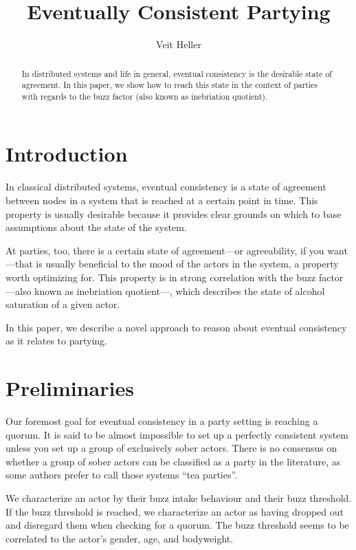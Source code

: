 \documentclass[twocolumn]{article}
\begin{document}
\title{Eventually Consistent Partying}
\author{Veit Heller}

\maketitle

\begin{abstract}
In distributed systems and life in general, eventual consistency is the
desirable state of agreement. In this paper, we show how to reach this state in
the context of parties with regards to the buzz factor (also known as
inebriation quotient).
\end{abstract}

\section{Introduction}

In classical distributed systems, eventual consistency is a state of agreement
between nodes in a system that is reached at a certain point in time. This
property is usually desirable because it provides clear grounds on which to
base assumptions about the state of the system.

At parties, too, there is a certain state of agreement—or agreeability, if you
want—that is usually beneficial to the mood of the actors in the system, a
property worth optimizing for. This property is in strong correlation with the
buzz factor—also known as inebriation quotient—, which describes the state of
alcohol saturation of a given actor.

In this paper, we describe a novel approach to reason about eventual
consistency as it relates to partying.

\section{Preliminaries}

Our foremost goal for eventual consistency in a party setting is reaching a
quorum. It is said to be almost impossible to set up a perfectly consistent
system unless you set up a group of exclusively sober actors. There is no
consensus on whether a group of sober actors can be classified as a party in
the literature, as some authors prefer to call those systems “tea parties”.

We characterize an actor by their buzz intake behaviour and their buzz
threshold. If the buzz threshold is reached, we characterize an actor as having
dropped out and disregard them when checking for a quorum. The buzz threshold
seems to be correlated to the actor’s gender, age, and bodyweight.
\end{document}
